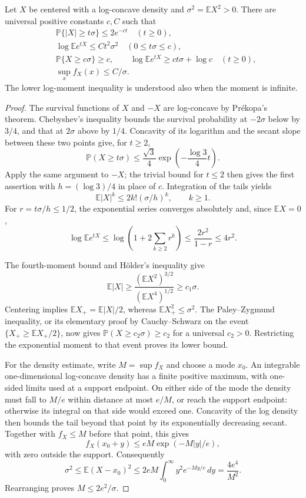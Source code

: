 \begin{lemma}
\label{fl:one-dimensional}
Let $X$ be centered with a log-concave density and
$\sigma^2=\mathbb E X^2>0$.  There are universal positive constants
$c,C$ such that
\[
\begin{split}
 &\mathbb P\{|X|\ge t\sigma\}\le2e^{-ct}\quad(t\ge0),\\
 &\log\mathbb E e^{tX}\le C t^2\sigma^2
                       \quad(0\le t\sigma\le c),\\
 &\mathbb P\{X\ge c\sigma\}\ge c,\qquad
   \log\mathbb E e^{tX}\ge ct\sigma+\log c\quad(t\ge0),\\
 &\sup_x f_X(x)\le C/\sigma.
\end{split}
\]
The lower log-moment inequality is understood also when the moment is
infinite.
\end{lemma}

\begin{proof}
The survival functions of $X$ and $-X$ are log-concave by
Pr\'ekopa's theorem.  Chebyshev's inequality bounds the survival
probability at $-2\sigma$ below by $3/4$, and that at $2\sigma$ above
by $1/4$.  Concavity of its logarithm and the secant slope between
these two points give, for $t\ge2$,
\[
 \mathbb P(X\ge t\sigma)\le\frac{\sqrt3}{4}
                    \exp\left(-\frac{\log3}{4}t\right).
\]
Apply the same argument to $-X$; the trivial bound for $t\le2$
then gives the first assertion with $h=(\log3)/4$ in place of $c$.
Integration of the tails yields
\[
 \mathbb E|X|^k\le2k!(\sigma/h)^k,\qquad k\ge1.
\]
For $r=t\sigma/h\le1/2$, the exponential series converges absolutely
and, since $\mathbb EX=0$,
\[
 \log\mathbb E e^{tX}
 \le\log\left(1+2\sum_{k\ge2}r^k\right)
 \le\frac{2r^2}{1-r}\le4r^2.
\]

The fourth-moment bound and H\"older's inequality give
\[
 \mathbb E|X|\ge
       \frac{(\mathbb EX^2)^{3/2}}{(\mathbb EX^4)^{1/2}}
       \ge c_1\sigma.
\]
Centering implies $\mathbb EX_+=\mathbb E|X|/2$, whereas
$\mathbb EX_+^2\le\sigma^2$.  The Paley--Zygmund inequality, or its
elementary proof by Cauchy--Schwarz on the event
$\{X_+\ge\mathbb EX_+/2\}$, now gives
$\mathbb P(X\ge c_2\sigma)\ge c_2$ for a universal $c_2>0$.
Restricting the exponential moment to that event proves its lower
bound.

For the density estimate, write $M=\sup f_X$ and choose a mode $x_0$.
An integrable one-dimensional log-concave density has a finite positive
maximum, with one-sided limits used at a support endpoint.  On either
side of the mode the density must fall to $M/e$ within distance at
most $e/M$, or reach the support endpoint: otherwise its integral on
that side would exceed one.  Concavity of the log density then bounds
the tail beyond that point by its exponentially decreasing secant.
Together with $f_X\le M$ before that point, this gives
\[
 f_X(x_0+y)\le eM\exp(-M|y|/e),
\]
with zero outside the support.  Consequently
\[
 \sigma^2\le\mathbb E(X-x_0)^2
       \le2eM\int_0^\infty y^2e^{-My/e}\,dy
       =\frac{4e^4}{M^2}.
\]
Rearranging proves $M\le2e^2/\sigma$.
\end{proof}

